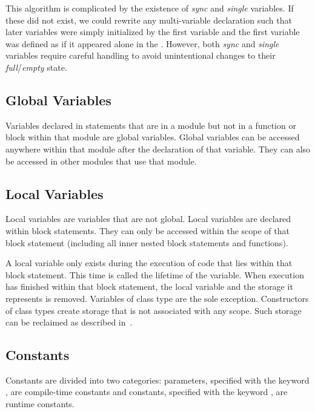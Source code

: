 \begin{rationale}
This algorithm is complicated by the existence of \emph{sync}
and \emph{single} variables.  If these did not exist, we could rewrite
any multi-variable declaration such that later variables were simply
initialized by the first variable and the first variable was defined
as if it appeared alone in the .  However,
both \emph{sync} and \emph{single} variables require careful handling
to avoid unintentional changes to their \emph{full}/\emph{empty}
state.
\end{rationale}

\subsection{Global Variables}
\label{Global_Variables}

Variables declared in statements that are in a module but not in a
function or block within that module are global variables.  Global
variables can be accessed anywhere within that module after the
declaration of that variable.  They can also be accessed in other
modules that use that module.

\subsection{Local Variables}
\label{Local_Variables}

Local variables are variables that are not global.  Local variables
are declared within block statements.  They can only be accessed
within the scope of that block statement (including all inner nested
block statements and functions).

A local variable only exists during the execution of code that lies
within that block statement.  This time is called the lifetime of the
variable.  When execution has finished within that block statement,
the local variable and the storage it represents is removed.
Variables of class type are the sole exception.  Constructors of class
types create storage that is not associated with any scope.  Such
storage can be reclaimed as described
in~.

\subsection{Constants}
\label{Constants}

Constants are divided into two categories: parameters, specified with
the keyword , are compile-time constants and constants,
specified with the keyword , are runtime constants.

